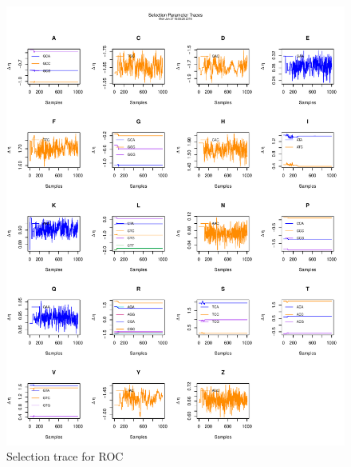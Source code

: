 \documentclass[11pt]{labbook}
\begin{document}
    \begin{figure}
        \centering
        \includegraphics[scale=.65]{FONSE_Plots/2016/June_27/ROC/Run1_SelectionTrace}
        \caption{Selection trace for ROC}
        \label{fig:JUN27_RSEL}
    \end{figure}
    
\end{document}
